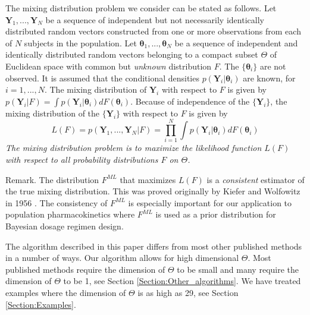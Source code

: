 
The mixing distribution problem we consider can be stated as follows.
%
Let $\bm{Y}_1, ... , \bm{Y}_N$ be a sequence of independent but not necessarily identically distributed random vectors %
%
constructed from one or more observations from each of $N$ subjects in the population.
%
Let $\bm{\theta}_1,...,\bm{\theta}_N$ be a sequence of independent and identically distributed 
random vectors belonging to a  compact subset $\Theta$ of Euclidean space with common but {\em unknown} distribution $F$.
%
The $\{\bm{\theta}_i\}$ are not observed.
%
It is assumed that the conditional densities $p(\bm{Y}_i \vert \bm{\theta}_i)$ are known, for $i = 1,...,N$.
%
The mixing distribution of $\bm{Y}_i$ with respect to $F$ is given by $p(\bm{Y}_i \vert F ) = \int p(\bm{Y}_i \vert \bm{\theta}_i ) dF(\bm{\theta}_i)$.
%
Because of independence of the $\{\bm{Y}_i\}$, the mixing distribution of the $\{\bm{Y}_i\}$ with respect to $F$ is given by
%
\begin{equation}
	L(F) = p(\bm{Y}_1,...,\bm{Y}_N \vert F) = \prod_{i=1}^N \int p \left(\bm{ Y}_i \vert \bm{\theta}_i \right) dF\left( \bm{\theta}_i \right)
\end{equation}
%
{\em The mixing distribution problem is to maximize the likelihood function  $L(F)$ with respect to all probability distributions $F$ on $\Theta$.}

Remark.
%
The distribution $F^{ML}$ that maximizes $L(F)$ is a {\em consistent} estimator of the true mixing distribution. This was proved originally by 
Kiefer and Wolfowitz in 1956
 \cite {Kiefer1956} . %
%
The consistency of $F^{ML}$ is especially important for our application to population pharmacokinetics where  $F^{ML}$ is used as a prior distribution for Bayesian dosage regimen design.


The algorithm described in this paper differs from most other published methods in a number of ways. Our algorithm allows for high dimensional $\Theta$.  
%
Most published methods require the dimension of $\Theta$ to be small and many require the dimension of $\Theta$ to be 1, see Section \ref{Section:Other_algorithms}. 
%
We have treated examples where the dimension of $\Theta$ is as high as 29, 
see Section \ref{Section:Examples}.
%

